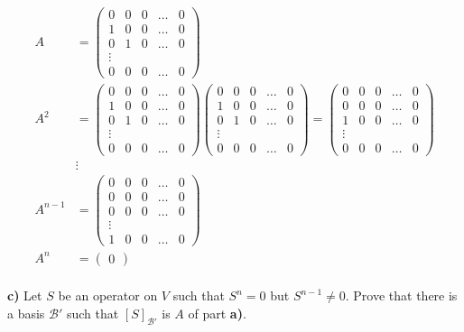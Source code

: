 \documentclass[11pt]{amsart}
\theoremstyle{definition}  %
\begin{document}
\begin{align*}
	A &= \left( \begin{array}{ccccc}
		0&0&0&\dots&0 \\
		1&0&0&\dots& 0 \\
		0&1&0&\dots&0\\
		\vdots \\
		0&0&0&\dots& 0
	\end{array} \right)\\
	A^2&=\left( \begin{array}{ccccc}
		0&0&0&\dots&0 \\
		1&0&0&\dots& 0 \\
		0&1&0&\dots&0\\
		\vdots \\
		0&0&0&\dots& 0
	\end{array} \right)\left( \begin{array}{ccccc}
		0&0&0&\dots&0 \\
		1&0&0&\dots& 0 \\
		0&1&0&\dots&0\\
		\vdots \\
		0&0&0&\dots& 0
	\end{array} \right) = \left( \begin{array}{ccccc}
		0&0&0&\dots&0 \\
		0&0&0&\dots& 0 \\
		1&0&0&\dots&0\\
		\vdots \\
		0&0&0&\dots& 0
	\end{array} \right)\\
	&\vdots \\
	A^{n-1}&= \left( \begin{array}{ccccc}
		0&0&0&\dots&0 \\
		0&0&0&\dots& 0 \\
		0&0&0&\dots&0\\
		\vdots \\
		1&0&0&\dots& 0
	\end{array} \right)\\
	A^n &= \left( \begin{array}{c}
	0
\end{array}	 \right)
\end{align*}
\\
{\bf c)} Let $S$ be an operator on $V$ such that $S^n = 0$ but $S^{n-1} \neq 0$. Prove that there is a basis $\mathcal{B}'$ such that
$[S]_{\mathcal{B}'}$ is  $A$ of part {\bf a)}. \\
\\
\end{document}
